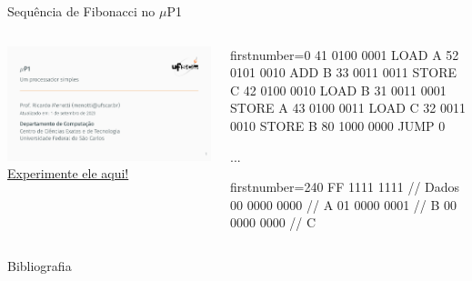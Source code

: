 \documentclass[aspectratio=169]{beamer}
\begin{document}
\begin{frame}[fragile]{Sequência de Fibonacci no $\mu$P1} \centering
    \begin{columns}
     \begin{column}{0.7\textwidth}
            \includegraphics[width=\textwidth]{uP1}
            \href{https://www.edaplayground.com/x/sNSX}{Experimente ele aqui!}
        \end{column}
         \begin{column}{0.3\textwidth}
            \begin{verilogcode*}{firstnumber=0}
41  0100 0001  LOAD  A
52  0101 0010  ADD   B
33  0011 0011  STORE C
42  0100 0010  LOAD  B
31  0011 0001  STORE A
43  0100 0011  LOAD  C
32  0011 0010  STORE B
80  1000 0000  JUMP  0
            \end{verilogcode*}
            ... 
            \begin{verilogcode*}{firstnumber=240}
FF  1111 1111  // Dados            
00  0000 0000  // A
01  0000 0001  // B  
00  0000 0000  // C
            \end{verilogcode*}
        \end{column}
    \end{columns}
\end{frame}

\begin{frame}{Bibliografia}
    \small


\end{frame}
\end{document}
